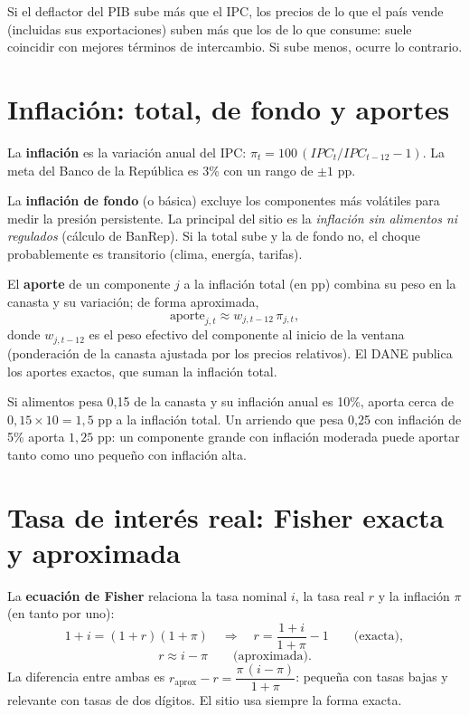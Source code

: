 \begin{leer}
Si el deflactor del PIB sube más que el IPC, los precios de lo que el país vende (incluidas sus exportaciones)
suben más que los de lo que consume: suele coincidir con mejores términos de intercambio. Si sube menos, ocurre
lo contrario.
\end{leer}

\section{Inflación: total, de fondo y aportes}
\label{es:f:inflacion}
La \textbf{inflación} es la variación anual del IPC: $\pi_t=100\,(IPC_t/IPC_{t-12}-1)$. La meta del Banco de la
República es 3\% con un rango de $\pm1$ pp.

La \textbf{inflación de fondo} (o básica) excluye los componentes más volátiles para medir la presión persistente.
La principal del sitio es la \emph{inflación sin alimentos ni regulados} (cálculo de BanRep). Si la total sube y
la de fondo no, el choque probablemente es transitorio (clima, energía, tarifas).

El \textbf{aporte} de un componente $j$ a la inflación total (en pp) combina su peso en la canasta y su
variación; de forma aproximada,
\[
\text{aporte}_{j,t}\approx w_{j,t-12}\,\pi_{j,t},
\]
donde $w_{j,t-12}$ es el peso efectivo del componente al inicio de la ventana (ponderación de la canasta ajustada
por los precios relativos). El DANE publica los aportes exactos, que suman la inflación total.

\begin{dato}
Si alimentos pesa 0,15 de la canasta y su inflación anual es 10\%, aporta cerca de $0{,}15\times10=1{,}5$ pp a la
inflación total. Un arriendo que pesa 0,25 con inflación de 5\% aporta $1{,}25$ pp: un componente grande con
inflación moderada puede aportar tanto como uno pequeño con inflación alta.
\end{dato}

\section{Tasa de interés real: Fisher exacta y aproximada}
\label{es:f:fisher}
La \textbf{ecuación de Fisher} relaciona la tasa nominal $i$, la tasa real $r$ y la inflación $\pi$ (en tanto
por uno):
\[
1+i=(1+r)(1+\pi)\quad\Longrightarrow\quad r=\frac{1+i}{1+\pi}-1\qquad\text{(exacta)},
\]
\[
r\approx i-\pi\qquad\text{(aproximada)}.
\]
La diferencia entre ambas es $r_{\text{aprox}}-r=\dfrac{\pi\,(i-\pi)}{1+\pi}$: pequeña con tasas bajas y
relevante con tasas de dos dígitos. El sitio usa siempre la forma exacta.

